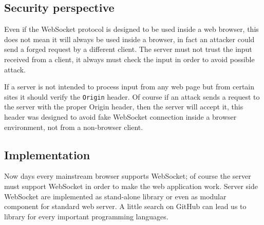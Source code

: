 \subsection{Security perspective}
Even if the WebSocket protocol is designed to be used inside a web browser, this does not mean it will always be used inside a browser, in fact an attacker could send a forged request by a different client.\newline
The server must not trust the input received from a client, it always must check the input in order to avoid possible attack.\newline

If a server is not intended to process input from any web page but from certain sites it should verify the \texttt{Origin} header.\newline
Of course if an attack sends a request to the server with the proper Origin header, then the server will accept it, this header was designed to
avoid fake WebSocket connection inside a browser environment, not from a non-browser client.\newline

\subsection{Implementation}
Now days every mainstream browser supports WebSocket; of course the server must support WebSocket in order to make the web application work.\newline
Server side WebSocket are implemented as stand-alone library or even as modular component for standard web server.\newline
A little search on GitHub can lead us to library for every important programming languages.

